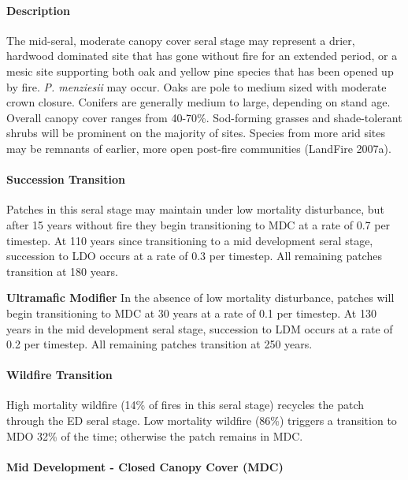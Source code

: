 \paragraph{Description} The mid-seral, moderate canopy cover seral stage may represent a drier, hardwood dominated site that has gone without fire for an extended period, or a mesic site supporting both oak and yellow pine species that has been opened up by fire. \emph{P. menziesii} may occur. Oaks are pole to medium sized with moderate crown closure. Conifers are generally medium to large, depending on stand age. Overall canopy cover ranges from 40-70\%. Sod-forming grasses and shade-tolerant shrubs will be prominent on the majority of sites. Species from more arid sites may be remnants of earlier, more open post-fire communities (LandFire 2007a).

\paragraph{Succession Transition} Patches in this seral stage may maintain under low mortality disturbance, but after 15 years without fire they begin transitioning to MDC at a rate of 0.7 per timestep. At 110 years since transitioning to a mid development seral stage, succession to LDO occurs at a rate of 0.3 per timestep. All remaining patches transition at 180 years.
\begin{adjustwidth}{2cm}{}

\medskip
\textbf{Ultramafic Modifier}  In the absence of low mortality disturbance, patches will begin transitioning to MDC at 30 years at a rate of 0.1 per timestep. At 130 years in the mid development seral stage, succession to LDM occurs at a rate of 0.2 per timestep. All remaining patches transition at 250 years.

\end{adjustwidth}
\paragraph{Wildfire Transition}
High mortality wildfire (14\% of fires in this seral stage) recycles the patch through the ED seral stage. Low mortality wildfire (86\%) triggers a transition to MDO 32\% of the time; otherwise the patch remains in MDC.

\noindent\hrulefill

\paragraph{Mid Development - Closed Canopy Cover (MDC)}

